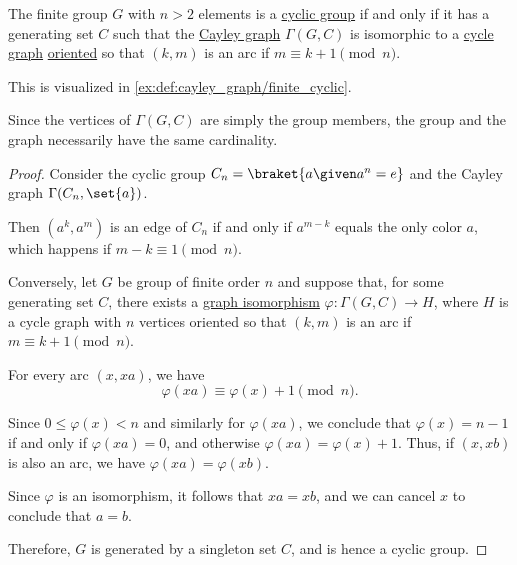 \begin{proposition}\label{thm:cayley_graph_of_finite_cyclic_group}
  The finite group \( G \) with \( n > 2 \) elements is a \hyperref[def:cyclic_group]{cyclic group} if and only if it has a generating set \( C \) such that the \hyperref[def:cayley_graph]{Cayley graph} \( \Gamma(G, C) \) is isomorphic to a \hyperref[def:cycle_graph]{cycle graph} \hyperref[def:multigraph_orientation]{oriented} so that \( (k, m) \) is an arc if \( m \equiv k + 1 \pmod n \).
\end{proposition}
\begin{comments}
  \item This is visualized in \cref{ex:def:cayley_graph/finite_cyclic}.
  \item Since the vertices of \( \Gamma(G, C) \) are simply the group members, the group and the graph necessarily have the same cardinality.
\end{comments}
\begin{proof}
  \SufficiencySubProof Consider the cyclic group \( C_n = \braket{ a \given a^n = e } \) and the Cayley graph \( \Gamma(C_n, \set{ a }) \).

  Then \( (a^k, a^m) \) is an edge of \( C_n \) if and only if \( a^{m - k} \) equals the only color \( a \), which happens if \( m - k \equiv 1 \pmod n \).

  \NecessitySubProof Conversely, let \( G \) be group of finite order \( n \) and suppose that, for some generating set \( C \), there exists a \hyperref[def:directed_graph/morphism]{graph isomorphism} \( \varphi: \Gamma(G, C) \to H \), where \( H \) is a cycle graph with \( n \) vertices oriented so that \( (k, m) \) is an arc if \( m \equiv k + 1 \pmod n \).

  For every arc \( (x, xa) \), we have
  \begin{equation*}
    \varphi(xa) \equiv \varphi(x) + 1 \pmod n.
  \end{equation*}

  Since \( 0 \leq \varphi(x) < n \) and similarly for \( \varphi(xa) \), we conclude that \( \varphi(x) = n - 1 \) if and only if \( \varphi(xa) = 0 \), and otherwise \( \varphi(xa) = \varphi(x) + 1 \). Thus, if \( (x, xb) \) is also an arc, we have \( \varphi(xa) = \varphi(xb) \).

  Since \( \varphi \) is an isomorphism, it follows that \( xa = xb \), and we can cancel \( x \) to conclude that \( a = b \).

  Therefore, \( G \) is generated by a singleton set \( C \), and is hence a cyclic group.
\end{proof}

